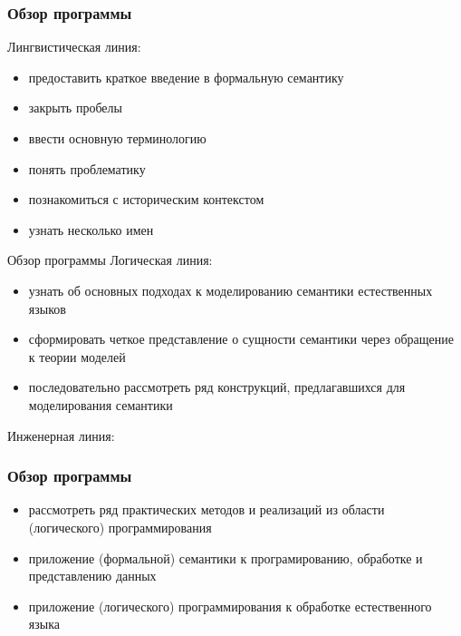 \documentclass{beamer}
\begin{document}
\begin{frame}[fragile]
\frametitle{Обзор программы}
Лингвистическая линия:\bigskip
\begin{itemize}
  \item предоставить краткое введение в формальную семантику
  \item закрыть пробелы
  \item ввести основную терминологию
  \item понять проблематику
  \item познакомиться с историческим контекстом
  \item узнать несколько имен
\end{itemize}
\end{frame}

\begin{frame}{Обзор программы}
Логическая линия:\bigskip
\begin{itemize}
  \item узнать об основных подходах к моделированию семантики естественных языков
  \item сформировать четкое представление о сущности семантики через обращение к теории моделей
  \item последовательно рассмотреть ряд конструкций, предлагавшихся для моделирования семантики
\end{itemize}
\end{frame}

\begin{frame}[fragile]
Инженерная линия:\bigskip
\frametitle{Обзор программы}
\begin{itemize}
  \item рассмотреть ряд практических методов и реализаций из области (логического) программирования
  \item приложение (формальной) семантики к програмированию, обработке и представлению данных
  \item приложение (логического) программирования к обработке естественного языка
\end{itemize}
\end{frame}
\end{document}
